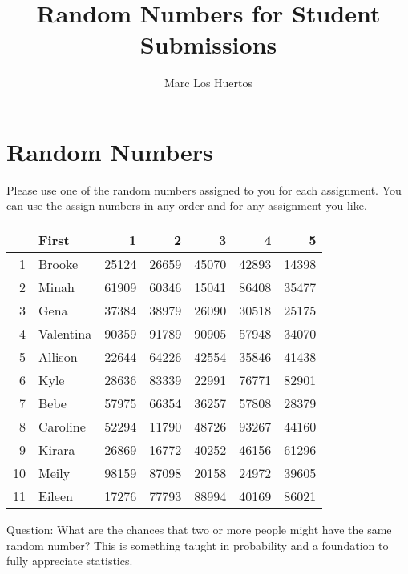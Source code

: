 \documentclass{article}\usepackage[]{graphicx}\usepackage[]{color}
\title{Random Numbers for Student Submissions}
\author{Marc Los Huertos}
\begin{document}
\maketitle


\section*{Random Numbers}

Please use one of the random numbers assigned to you for each assignment. You can use the assign numbers in any order and for any assignment you like. 

\begin{table}[ht]
\centering
\begin{tabular}{rlrrrrr}
  \hline
 & First & 1 & 2 & 3 & 4 & 5 \\ 
  \hline
1 & Brooke & 25124 & 26659 & 45070 & 42893 & 14398 \\ 
  2 & Minah & 61909 & 60346 & 15041 & 86408 & 35477 \\ 
  3 & Gena & 37384 & 38979 & 26090 & 30518 & 25175 \\ 
  4 & Valentina & 90359 & 91789 & 90905 & 57948 & 34070 \\ 
  5 & Allison & 22644 & 64226 & 42554 & 35846 & 41438 \\ 
  6 & Kyle & 28636 & 83339 & 22991 & 76771 & 82901 \\ 
  7 & Bebe & 57975 & 66354 & 36257 & 57808 & 28379 \\ 
  8 & Caroline & 52294 & 11790 & 48726 & 93267 & 44160 \\ 
  9 & Kirara & 26869 & 16772 & 40252 & 46156 & 61296 \\ 
  10 & Meily & 98159 & 87098 & 20158 & 24972 & 39605 \\ 
  11 & Eileen & 17276 & 77793 & 88994 & 40169 & 86021 \\ 
   \hline
\end{tabular}
\end{table}


Question: What are the chances that two or more people might have the same random number?  This is something taught in probability and a foundation to fully appreciate statistics.
\end{document}
